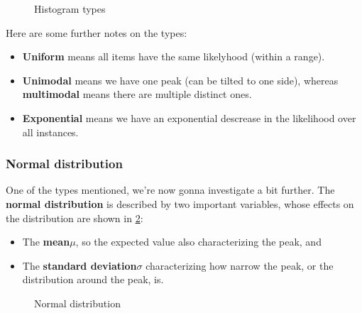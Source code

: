 \begin{figure}[H]
  \caption{Histogram types}
  \label{fig:2_histogram_types}
\end{figure}

Here are some further notes on the types:
\begin{itemize}
  \item \textbf{Uniform} means all items have the same likelyhood (within a range).
  \item \textbf{Unimodal} means we have one peak (can be tilted to one side), whereas \textbf{multimodal} means there are multiple distinct ones.
  \item \textbf{Exponential} means we have an exponential descrease in the likelihood over all instances.
\end{itemize}


\subsubsection*{Normal distribution}

One of the types mentioned, we're now gonna investigate a bit further. The \textbf{normal distribution} is described by two important variables, whose effects on the distribution are shown in \ref{fig:2_normal}:
\begin{itemize}
  \item The \textbf{mean}$\mu$, so the expected value also characterizing the peak, and
  \item The \textbf{standard deviation}$\sigma$ characterizing how narrow the peak, or the distribution around the peak, is.
\end{itemize}

\begin{figure}[H]
  \centering
  \hspace*{0.05\textwidth}
  \caption{Normal distribution}
  \label{fig:2_normal}
\end{figure}

